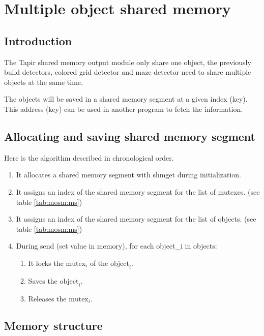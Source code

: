 \section{Multiple object shared memory}
\label{sec:mosm}

\subsection{Introduction}
\label{sec:mosm:intro}

The Tapir shared memory output module only share one object, the 
previously build detectors, colored grid detector and maze detector 
need to share multiple objects at the same time. 

The objects will be saved in a shared memory segment at a given index 
(key). This address (key) can be used in another program to fetch the 
information.

\subsection{Allocating and saving shared memory segment}
\label{sec:mosm:algo}
Here is the algorithm described in chronological order.

    \begin{enumerate}
        \item It allocates a shared memory segment with shmget during 
            initialization.
        \item It assigns an index of the shared memory segment for the list 
            of mutexes. (see table \ref{tab:mosm:ms})
        \item It assigns an index of the shared memory segment for the list 
            of objects. (see table \ref{tab:mosm:ms})
        \item During send (set value in memory), for each object\_i in objects:
        \begin{enumerate}
            \item It locks the $\mbox{mutex}_i$ of the $\mbox{object}_i$.
            \item Saves the $\mbox{object}_i$.
            \item Releases the $\mbox{mutex}_i$.
        \end{enumerate}
    \end{enumerate}

\subsection{Memory structure}
\label{sec:mosm:ms}

